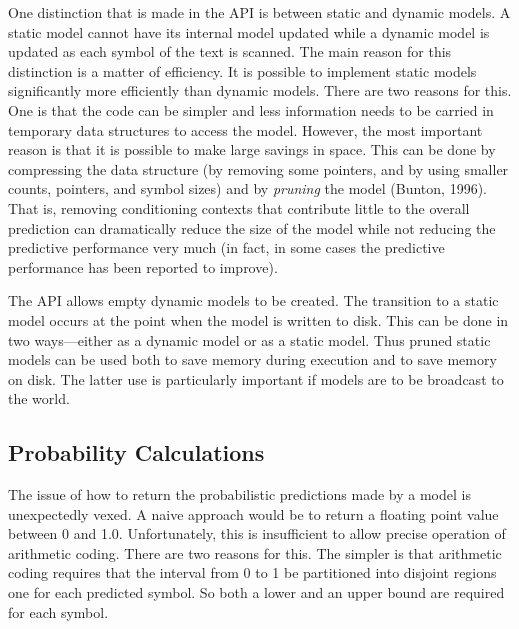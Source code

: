 \documentclass[11pt]{article}
\begin{document}
One distinction that is made in the API is between static and dynamic
models. A static model cannot have its internal model updated while a
dynamic model is updated as each symbol of the text is scanned. The main
reason for this distinction is a matter of efficiency. It is possible to
implement static models significantly more efficiently than dynamic models.
There are two reasons for this. One is that the code can be simpler and less
information needs to be carried in temporary data structures to access the
model. However, the most important reason is that it is possible to make
large savings in space. This can be done by compressing the data structure
(by removing some pointers, and by using smaller counts, pointers, and
symbol sizes) and by \emph{pruning} the model (Bunton, 1996).
That is, removing conditioning contexts that contribute little to the
overall prediction can dramatically reduce the size of the model while not
reducing the predictive performance very much (in fact, in some cases the
predictive performance has been reported to improve).

The API allows empty dynamic models to be created. The transition to a
static model occurs at the point when the model is written to disk. This can
be done in two ways---either as a dynamic model or as a static model. Thus
pruned static models can be used both to save memory during execution and to
save memory on disk. The latter use is particularly important if models are
to be broadcast to the world.

\subsection{Probability Calculations}

The issue of how to return the probabilistic predictions made by a model is
unexpectedly vexed. A naive approach would be to return a floating point
value between 0 and 1.0. Unfortunately, this is insufficient to allow
precise operation of arithmetic coding. There are two reasons for this. The
simpler is that arithmetic coding requires that the interval from 0 to 1 be
partitioned into disjoint regions one for each predicted symbol. So both a
lower and an upper bound are required for each symbol.
\end{document}
